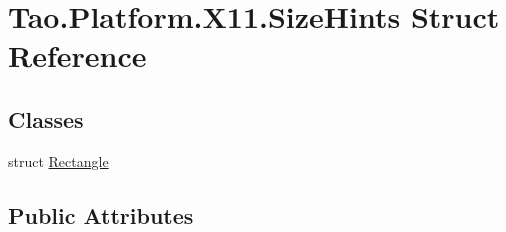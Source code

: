 \hypertarget{struct_tao_1_1_platform_1_1_x11_1_1_size_hints}{
\section{Tao.Platform.X11.SizeHints Struct Reference}
\label{struct_tao_1_1_platform_1_1_x11_1_1_size_hints}
}
\subsection*{Classes}
\begin{DoxyCompactItemize}
\item 
struct \hyperlink{struct_tao_1_1_platform_1_1_x11_1_1_size_hints_1_1_rectangle}{Rectangle}
\end{DoxyCompactItemize}
\subsection*{Public Attributes}
